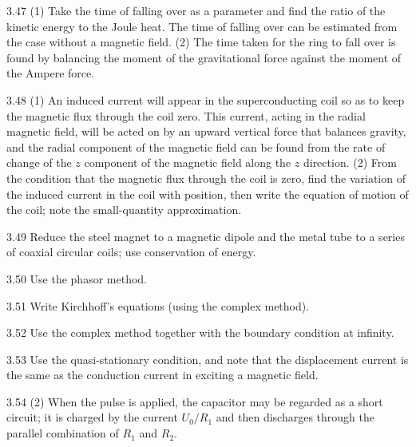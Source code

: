 \begin{hint}{3.47}
(1) Take the time of falling over as a parameter and find the ratio of the kinetic energy to the Joule heat. The time of falling over can be estimated from the case without a magnetic field. (2) The time taken for the ring to fall over is found by balancing the moment of the gravitational force against the moment of the Ampere force.
\end{hint}

\begin{hint}{3.48}
(1) An induced current will appear in the superconducting coil so as to keep the magnetic flux through the coil zero. This current, acting in the radial magnetic field, will be acted on by an upward vertical force that balances gravity, and the radial component of the magnetic field can be found from the rate of change of the $z$ component of the magnetic field along the $z$ direction. (2) From the condition that the magnetic flux through the coil is zero, find the variation of the induced current in the coil with position, then write the equation of motion of the coil; note the small-quantity approximation.
\end{hint}

\begin{hint}{3.49}
Reduce the steel magnet to a magnetic dipole and the metal tube to a series of coaxial circular coils; use conservation of energy.
\end{hint}

\begin{hint}{3.50}
Use the phasor method.
\end{hint}

\begin{hint}{3.51}
Write Kirchhoff's equations (using the complex method).
\end{hint}

\begin{hint}{3.52}
Use the complex method together with the boundary condition at infinity.
\end{hint}

\begin{hint}{3.53}
Use the quasi-stationary condition, and note that the displacement current is the same as the conduction current in exciting a magnetic field.
\end{hint}

\begin{hint}{3.54}
(2) When the pulse is applied, the capacitor may be regarded as a short circuit; it is charged by the current $U_0/R_1$ and then discharges through the parallel combination of $R_1$ and $R_2$.
\end{hint}

